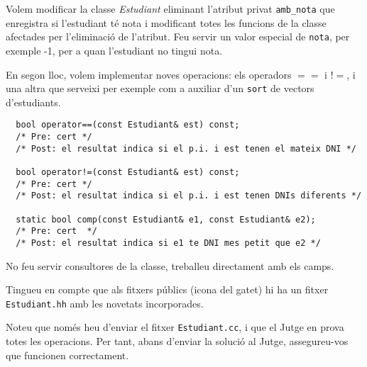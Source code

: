 
\Statement

Volem modificar la classe \emph{Estudiant} eliminant l'atribut
privat \texttt{amb\_nota} que enregistra si l'estudiant té nota i modificant
totes les funcions de la classe afectades per l'eliminació de l'atribut. Feu
servir un valor especial de \texttt{nota}, per exemple -1, per a quan
l'estudiant no tingui nota.

En segon lloc, volem implementar noves operacions: els operadors $==$ i $!=$, i una altra que serveixi per exemple com a auxiliar
d'un \texttt{sort} de vectors d'estudiants.

\begin{verbatim}   
  bool operator==(const Estudiant& est) const;
  /* Pre: cert */
  /* Post: el resultat indica si el p.i. i est tenen el mateix DNI */

  bool operator!=(const Estudiant& est) const;
  /* Pre: cert */
  /* Post: el resultat indica si el p.i. i est tenen DNIs diferents */

  static bool comp(const Estudiant& e1, const Estudiant& e2);
  /* Pre: cert  */
  /* Post: el resultat indica si e1 te DNI mes petit que e2 */
\end{verbatim}

No feu servir consultores de la classe, treballeu directament amb els camps.

\Observation
Tingueu en compte que als fitxers p\'ublics (icona del gatet) hi ha un  fitxer \texttt{Estudiant.hh} amb les novetats incorporades.
  
Noteu que només heu d'enviar el fitxer \texttt{Estudiant.cc}, i que el
Jutge en prova totes les operacions. Per tant, abans d'enviar la
solució al Jutge, assegureu-vos que funcionen correctament.
